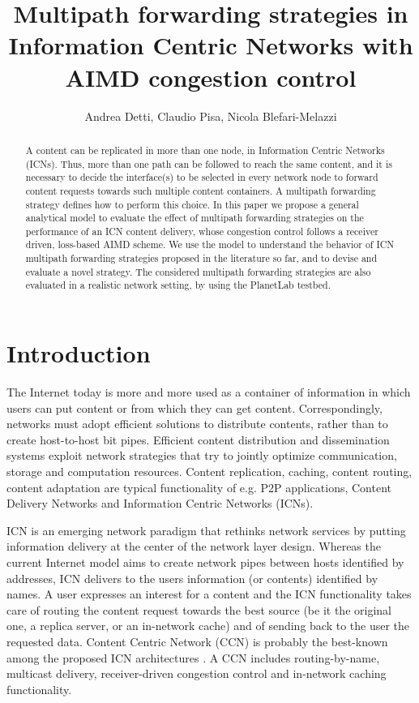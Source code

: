 \documentclass{sig-alternate-10pt}
\title{Multipath forwarding strategies in Information Centric Networks with AIMD congestion control}
\author{
\alignauthor
Andrea Detti,  Claudio Pisa, Nicola Blefari-Melazzi\\
\affaddr{CNIT University of Rome Tor Vergata}
\email{name.surname@uniroma2.it}
}
\begin{document}
\maketitle


\begin{abstract}
A content can be replicated in more than one node, in Information Centric Networks (ICNs). Thus, more than one path can be followed to reach the same content, and it is necessary to decide the interface(s) to be selected in every network node to forward content requests towards such multiple content containers. A multipath forwarding strategy defines how to perform this choice. 
In this paper we propose a general analytical model to evaluate the effect of multipath forwarding strategies on the performance of an ICN content delivery, whose congestion control follows a receiver driven, loss-based AIMD scheme. We use the model to understand the behavior of ICN multipath forwarding strategies proposed in the literature so far, and to devise and evaluate a novel strategy. The considered multipath forwarding strategies are also evaluated in a realistic network setting, by using the PlanetLab testbed.
\end{abstract}







\section{Introduction}
The Internet today is more and more used as a container of information in which users can put content or from which they can get content.
Correspondingly, networks must adopt efficient solutions to distribute contents, rather than to create host-to-host bit pipes.
Efficient content distribution and dissemination systems exploit network strategies that try to jointly optimize communication, storage and computation resources. Content replication, caching, content routing, content adaptation are typical functionality of e.g. P2P applications, Content Delivery Networks and Information Centric Networks (ICNs).

ICN is an emerging network paradigm that rethinks network services by putting information delivery at the center of the network layer design. Whereas the current Internet model aims to create network pipes between hosts identified by addresses, ICN delivers to the users information (or contents) identified by names. A user expresses an interest for a content and the ICN functionality takes care of routing the content request towards the best source (be it the original one, a replica server, or an in-network cache) and of sending back to the user the requested data. Content Centric Network (CCN) \cite{jacobson2009networking} is probably the best-known among the proposed ICN architectures \cite{polyzos}. A CCN includes routing-by-name,  multicast delivery, receiver-driven congestion control and in-network caching functionality.
\end{document}
